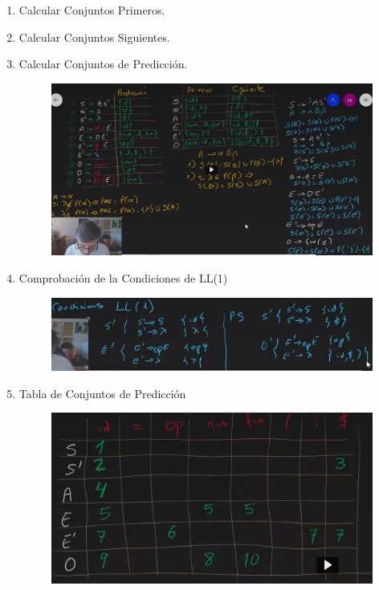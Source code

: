 \documentclass[12pt]{report} %
\begin{document}
\begin{enumerate}
\def\labelenumi{\arabic{enumi}.}

\item
  Calcular Conjuntos Primeros.
\item
  Calcular Conjuntos Siguientes.
\item
  Calcular Conjuntos de Predicción.

\begin{figure}[H]
	{\includegraphics[scale=.12]{image-20210320110844879.png}}
\end{figure}

\item
  Comprobación de la Condiciones de
  LL(1)
  
  \begin{figure}[H]
	{\includegraphics[scale=.17]{image-20210320110940170.png}}
\end{figure}

\pagebreak
\item
  Tabla de Conjuntos de Predicción


  \begin{figure}[H]
	{\includegraphics[scale=.2]{image-20210320111419566.png}}
\end{figure}


\end{enumerate}
\end{document}
